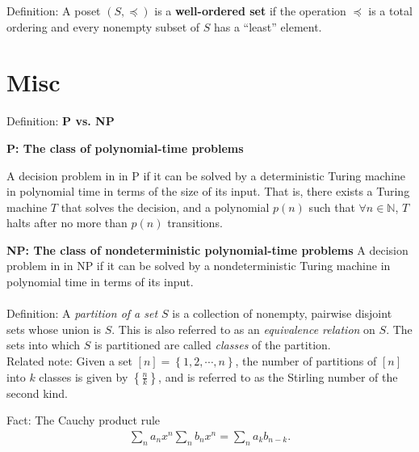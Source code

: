 \documentclass[a4paper,10pt]{report}
\begin{document}
Definition: A poset $(S, \preccurlyeq)$ is a \textbf{well-ordered set} if the operation $\preccurlyeq$ is a total ordering and every nonempty subset of $S$ has a ``least'' element.

\chapter{Misc}
Definition: \textbf{P vs. NP}

\textbf{P: The class of polynomial-time problems}

A decision problem in in P if it can be solved by a deterministic Turing machine in polynomial time in terms of the size of its input. That is, there exists a Turing machine $T$ that solves the decision, and a polynomial $p(n)$ such that $\forall n\in \mathbb{N}$, $T$ halts after no more than $p(n)$ transitions.

\textbf{NP: The class of nondeterministic polynomial-time problems}
A decision problem in in NP if it can be solved by a nondeterministic Turing machine in polynomial time in terms of its input. \\ \\

Definition: A \textit{partition of a set $S$} is a collection of nonempty, pairwise disjoint sets whose union is $S$. This is also referred to as an \textit{equivalence relation} on $S$. The sets into which $S$ is partitioned are called \textit{classes} of the partition. \\

\indent Related note: Given a set $[n] = \left\{1,2,\cdots , n\right\}$, the number of partitions of $[n]$ into $k$ classes is given by $\left\{\frac{n}{k}\right\}$, and is referred to as the Stirling number of the second kind.

Fact: The Cauchy product rule
\begin{gather}
	\sum_n a_nx^n \sum_n b_nx^n = \sum_n a_k b_{n-k}.
\end{gather}
\end{document}
